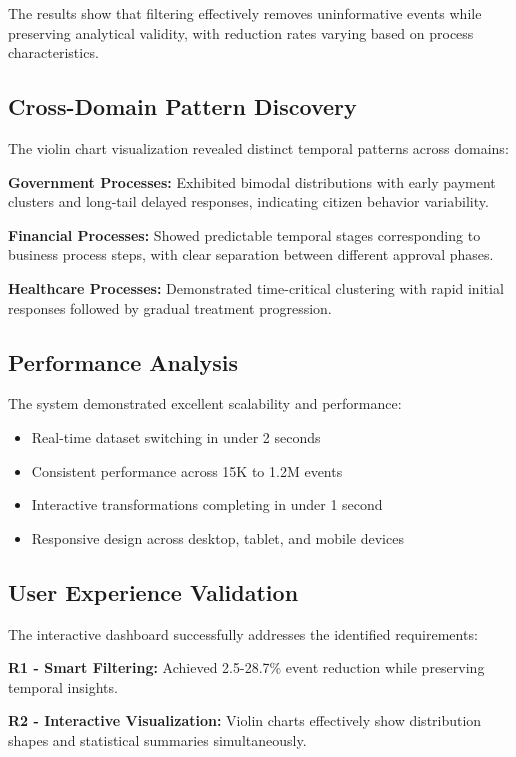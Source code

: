 \documentclass[11pt,a4paper]{article}
\begin{document}
The results show that filtering effectively removes uninformative events while preserving analytical validity, with reduction rates varying based on process characteristics.

\subsection{Cross-Domain Pattern Discovery}

The violin chart visualization revealed distinct temporal patterns across domains:

\textbf{Government Processes:} Exhibited bimodal distributions with early payment clusters and long-tail delayed responses, indicating citizen behavior variability.

\textbf{Financial Processes:} Showed predictable temporal stages corresponding to business process steps, with clear separation between different approval phases.

\textbf{Healthcare Processes:} Demonstrated time-critical clustering with rapid initial responses followed by gradual treatment progression.

\subsection{Performance Analysis}

The system demonstrated excellent scalability and performance:

\begin{itemize}
    \item Real-time dataset switching in under 2 seconds
    \item Consistent performance across 15K to 1.2M events
    \item Interactive transformations completing in under 1 second
    \item Responsive design across desktop, tablet, and mobile devices
\end{itemize}

\subsection{User Experience Validation}

The interactive dashboard successfully addresses the identified requirements:

\textbf{R1 - Smart Filtering:} Achieved 2.5-28.7\% event reduction while preserving temporal insights.

\textbf{R2 - Interactive Visualization:} Violin charts effectively show distribution shapes and statistical summaries simultaneously.
\end{document}
